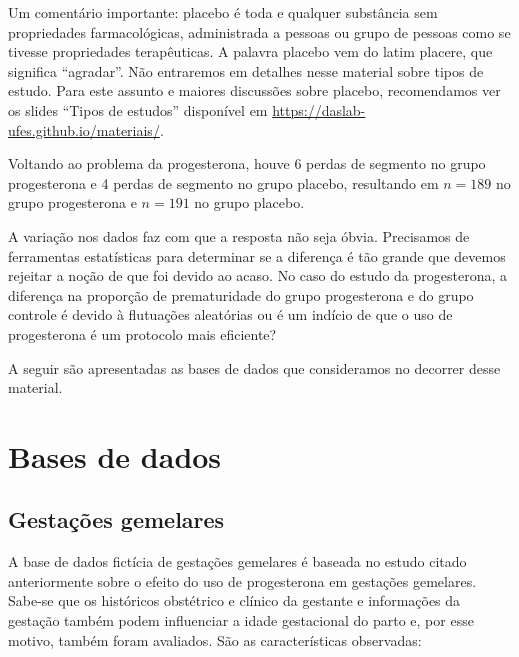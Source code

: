 \documentclass[
]{book}
\begin{document}
Um comentário importante: placebo é toda e qualquer substância sem propriedades farmacológicas, administrada a pessoas ou grupo de pessoas como se tivesse propriedades terapêuticas. A palavra placebo vem do latim placere, que significa ``agradar''. Não entraremos em detalhes nesse material sobre tipos de estudo. Para este assunto e maiores discussões sobre placebo, recomendamos ver os slides ``Tipos de estudos'' disponível em \url{https://daslab-ufes.github.io/materiais/}.

Voltando ao problema da progesterona, houve 6 perdas de segmento no grupo progesterona e 4 perdas de segmento no grupo placebo, resultando em \(n=189\) no grupo progesterona e \(n=191\) no grupo placebo.

A variação nos dados faz com que a resposta não seja óbvia. Precisamos de ferramentas estatísticas para determinar se a
diferença é tão grande que devemos rejeitar a noção de que foi devido ao acaso.
No caso do estudo da progesterona, a diferença na proporção
de prematuridade do grupo progesterona e do grupo controle é
devido à flutuações aleatórias ou é um indício de que o uso de progesterona é um protocolo mais eficiente?

A seguir são apresentadas as bases de dados que consideramos no decorrer desse material.

\hypertarget{bases-de-dados}{%
\section{Bases de dados}\label{bases-de-dados}}

\hypertarget{dados_gemelares}{%
\subsection{Gestações gemelares}\label{dados_gemelares}}

A base de dados fictícia de gestações gemelares é baseada no estudo citado anteriormente sobre o efeito do uso de progesterona em gestações gemelares. Sabe-se que os históricos obstétrico e clínico da gestante e informações da gestação também podem influenciar a idade gestacional do parto e, por esse motivo, também foram avaliados. São as características observadas:
\end{document}
